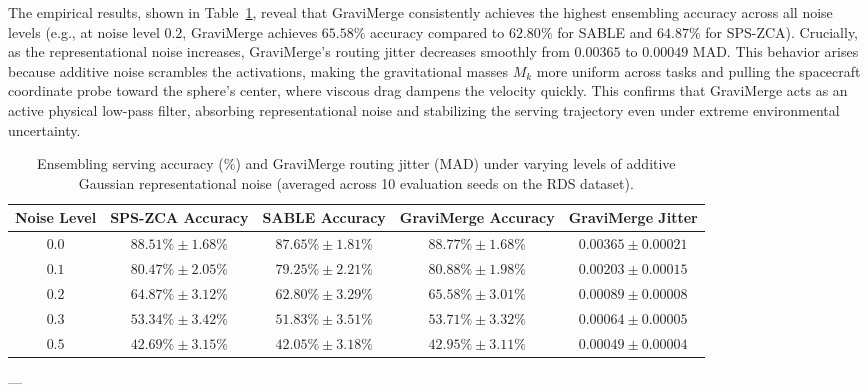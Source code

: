 The empirical results, shown in Table~\ref{tab:noise_results}, reveal that GraviMerge consistently achieves the highest ensembling accuracy across all noise levels (e.g., at noise level $0.2$, GraviMerge achieves $65.58\%$ accuracy compared to $62.80\%$ for SABLE and $64.87\%$ for SPS-ZCA). Crucially, as the representational noise increases, GraviMerge's routing jitter decreases smoothly from $0.00365$ to $0.00049$ MAD. This behavior arises because additive noise scrambles the activations, making the gravitational masses $M_k$ more uniform across tasks and pulling the spacecraft coordinate probe toward the sphere's center, where viscous drag dampens the velocity quickly. This confirms that GraviMerge acts as an active physical low-pass filter, absorbing representational noise and stabilizing the serving trajectory even under extreme environmental uncertainty.

\begin{table}[h]
\centering
\caption{Ensembling serving accuracy (\%) and GraviMerge routing jitter (MAD) under varying levels of additive Gaussian representational noise (averaged across 10 evaluation seeds on the RDS dataset).}
\label{tab:noise_results}
\vskip 0.05in
\begin{small}
\begin{sc}
\begin{tabular}{ccccc}
\toprule
Noise Level & SPS-ZCA Accuracy & SABLE Accuracy & GraviMerge Accuracy & GraviMerge Jitter \\
\midrule
$0.0$ & $88.51\% \pm 1.68\%$ & $87.65\% \pm 1.81\%$ & $\mathbf{88.77\% \pm 1.68\%}$ & $0.00365 \pm 0.00021$ \\
$0.1$ & $80.47\% \pm 2.05\%$ & $79.25\% \pm 2.21\%$ & $\mathbf{80.88\% \pm 1.98\%}$ & $0.00203 \pm 0.00015$ \\
$0.2$ & $64.87\% \pm 3.12\%$ & $62.80\% \pm 3.29\%$ & $\mathbf{65.58\% \pm 3.01\%}$ & $0.00089 \pm 0.00008$ \\
$0.3$ & $53.34\% \pm 3.42\%$ & $51.83\% \pm 3.51\%$ & $\mathbf{53.71\% \pm 3.32\%}$ & $0.00064 \pm 0.00005$ \\
$0.5$ & $42.69\% \pm 3.15\%$ & $42.05\% \pm 3.18\%$ & $\mathbf{42.95\% \pm 3.11\%}$ & $0.00049 \pm 0.00004$ \\
\bottomrule
\end{tabular}
\end{sc}
\end{small}
\end{table}

---

